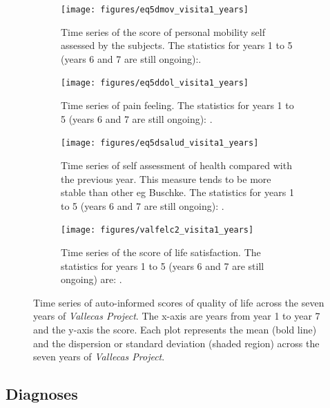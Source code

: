 \documentclass[11pt]{article}
\theoremstyle{definition}
\theoremstyle{remark}
\begin{document}
\begin{figure}[H]
    \centering
    \begin{subfigure}[t]{0.45\textwidth}
        \centering
        \texttt{[image: figures/eq5dmov\_visita1\_years]}
        \caption{Time series of the score of personal mobility self assessed by the subjects. The statistics for years 1 to 5 (years 6 and 7 are still ongoing):.}
    \end{subfigure}
    \hfill 
    \begin{subfigure}[t]{0.45\textwidth}
        \centering
        \texttt{[image: figures/eq5ddol\_visita1\_years]}
        \caption{Time series of pain feeling. The statistics for years 1 to 5 (years 6 and 7 are still ongoing): .}
    \end{subfigure}%
    
     \begin{subfigure}[t]{0.45\textwidth}
        \centering
        \texttt{[image: figures/eq5dsalud\_visita1\_years]}
        \caption{Time series of self assessment of health compared with the previous year. This measure tends to be more stable than other eg Buschke. The statistics for years 1 to 5 (years 6 and 7 are still ongoing): .}
    \end{subfigure}
    \hfill
    \begin{subfigure}[t]{0.45\textwidth}
        \centering
        \texttt{[image: figures/valfelc2\_visita1\_years]}
        \caption{Time series of the score of life satisfaction. The statistics for years 1 to 5 (years 6 and 7 are still ongoing) are: .}
    \end{subfigure}%
   
    \caption{Time series of auto-informed scores of quality of life across the seven years of \emph{Vallecas Project}. The x-axis are years from year 1 to year 7 and the y-axis the score. Each plot represents the mean (bold line) and the dispersion or standard deviation (shaded region) across the seven years of \emph{Vallecas Project}.}
    \label{fig:qol4}
\end{figure}

\subsection{Diagnoses}
\label{sse:scd}
\end{document}
